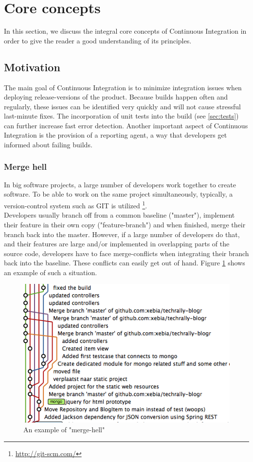 \section{Core concepts}\label{sec:core-concepts}

In this section, we discuss the integral core concepts of Continuous Integration
in order to give the reader a good understanding of its principles.

\subsection{Motivation}\label{sec:motivation}

The main goal of Continuous Integration is to minimize integration issues when
deploying release-versions of the product. Because builds happen often and
regularly, these issues can be identified very quickly and will not cause
stressful last-minute fixes. The incorporation of unit tests into the
build (see \ref{sec:tests}) can further increase fast error detection. Another
important aspect of Continuous Integration is the provision of a reporting
agent, a way that developers get informed about failing builds.

\subsubsection{Merge hell}

In big software projects, a large number of developers work together to create
software. To be able to work on the same project simultaneously, typically, a
version-control system such as GIT is utilized
\footnote{\url{http://git-scm.com/}}.\\

Developers usually branch off from a common baseline ("master"), implement their
feature in their own copy ("feature-branch") and when finished, merge their
branch back into the master. However, if a large number of developers do that,
and their features are large and/or implemented in overlapping parts of the
source code, developers have to face merge-conflicts when integrating their
branch back into the baseline. These conflicts can easily get out of hand.
Figure \ref{fig:merge-hell} shows an example of such a situation.

\begin{figure}[h]
    \centering
    \includegraphics[width=0.6\linewidth]{images/merge-hell.png}
    \caption{An example of "merge-hell" \cite{mooij:2010}}
    \label{fig:merge-hell}
\end{figure}

